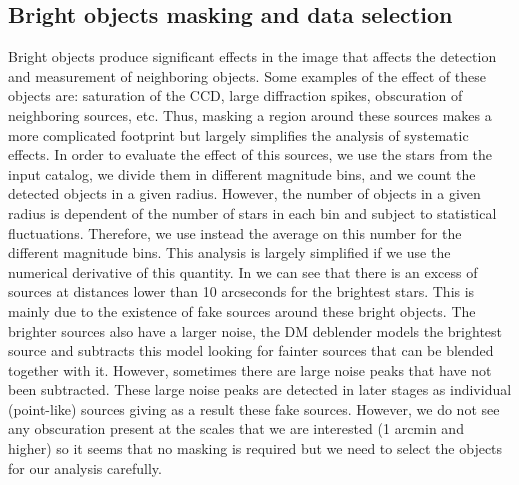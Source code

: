 \documentclass[\docopts]{\docclass}
\begin{document}
\subsection{Bright objects masking and data selection}

Bright objects produce significant effects in the image that affects the detection and measurement of neighboring objects. Some examples of the effect of these objects are: saturation of the CCD, large diffraction spikes, obscuration of neighboring sources, etc. Thus, masking a region around these sources makes a more complicated footprint but largely simplifies the analysis of systematic effects. In order to evaluate the effect of this sources, we use the stars from the input catalog, we divide them in different magnitude bins, and we count the detected objects in a given radius. However, the number of objects in a given radius is dependent of the number of stars in each bin and subject to statistical fluctuations. Therefore, we use instead the average on this number for the different magnitude bins. This analysis is largely simplified if we use the numerical derivative of this quantity. In  we can see that there is an excess of sources at distances lower than 10 arcseconds for the brightest stars. This is mainly due to the existence of fake sources around these bright objects. The brighter sources also have a larger noise, the DM deblender models the brightest source and subtracts this model looking for fainter sources that can be blended together with it. However, sometimes there are large noise peaks that have not been subtracted. These large noise peaks are detected in later stages as individual (point-like) sources giving as a result these fake sources. However, we do not see any obscuration present at the scales that we are interested (1 arcmin and higher) so it seems that no masking is required but we need to select the objects for our analysis carefully.
\end{document}
